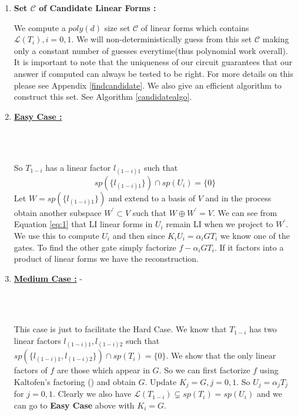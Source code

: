 \documentclass[letterpaper,USenglish,numberwithinsect]{lipics}
\newcommand{\ML}{\mathcal{L}}
\newcommand{\MC}{\mathcal{C}}
\begin{document}
\begin{enumerate}
    \item \label{candidateset}{\bf Set $\MC$ of Candidate Linear Forms :}

    We compute a $poly(d)$ size set $\MC$ of linear forms which contains
$\ML(T_i), i=0,1$. We will non-deterministically guess from this set $\MC$
making only a constant number of guesses everytime(thus polynomial work
overall). It is important to note that the
uniqueness of our circuit guarantees that our answer if computed can always be
tested to be right. For more details on this please see Appendix \ref{findcandidate}.
We also give an efficient algorithm to construct this set. See Algorithm \ref{candidatealgo}.\\



    \item \label{partknown} \underline{\bf Easy Case  :}
\centerline{\fbox{$\ML(T_{1-i}) \subsetneq sp(U_{i}),$ for
some $i\in \{0,1\}$ : }\\}\\

        So $T_{1-i}$ has a linear factor $l_{(1-i)1}$ such that
\begin{equation}\label{eq:1}
 sp(\{l_{(1-i)1}\})\cap sp(U_{i})=\{0\}
\end{equation}
Let $W = sp(\{l_{(1-i)1}\})$ and extend
to a basis of $V$ and in the process obtain
        another subspace $W^\prime\subset V$ such that $W\oplus W^\prime = V$.
We can see from Equation \ref{eq:1} that LI linear forms in $U_{i}$ remain LI
    when we project to $W^\prime$. We use this to compute $U_i$ and then
    since $K_iU_i=\alpha_iGT_i$ we know one of the gates. To find the other gate
simply factorize $f-\alpha_iGT_i$.
    If it factors into a product of linear forms we have the reconstruction.\\


       \item \label{dimensiongap} \underline{\bf Medium Case :} -
\centerline{\\}\\

This case is just to facilitate the Hard Case.
     We know that $T_{1-i}$ has two linear factors $l_{(1-i)1},l_{(1-i)2}$ such that
$sp(\{l_{(1-i)1},l_{(1-i)2}\})\cap sp(T_i)=\{0\}$. We show that the
only linear factors of $f$ are those which appear in $G$. So we can first
factorize $f$ using Kaltofen's factoring (\cite{KalTr90}) and obtain $G$.
Update $K_j=G, j=0,1$. So $U_j = \alpha_jT_j$ for $j=0,1$. Clearly we also have
$\ML(T_{1-i})\subsetneq sp(T_i) = sp(U_i)$ and we can go to {\bf Easy Case }
above with $K_i=G$.\\



\end{enumerate}
\end{document}
